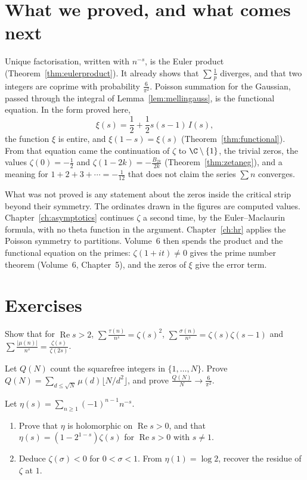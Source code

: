 \section{What we proved, and what comes next}

Unique factorisation, written with $n^{-s}$, is the Euler product (Theorem~\ref{thm:eulerproduct}). It already shows that $\sum\frac1p$ diverges, and that two integers are coprime with probability $\frac6{\pi^2}$. Poisson summation for the Gaussian, passed through the integral of Lemma~\ref{lem:mellingauss}, is the functional equation. In the form proved here,
\[
\xi(s)=\frac12+\frac12 s(s-1)\,I(s),
\]
the function $\xi$ is entire, and $\xi(1-s)=\xi(s)$ (Theorem~\ref{thm:functional}). From that equation came the continuation of $\zeta$ to $\C\setminus\{1\}$, the trivial zeros, the values $\zeta(0)=-\frac12$ and $\zeta(1-2k)=-\frac{B_{2k}}{2k}$ (Theorem~\ref{thm:zetaneg}), and a meaning for $1+2+3+\cdots=-\frac1{12}$ that does not claim the series $\sum n$ converges.

What was not proved is any statement about the zeros inside the critical strip beyond their symmetry. The ordinates drawn in the figures are computed values. Chapter~\ref{ch:asymptotics} continues $\zeta$ a second time, by the Euler--Maclaurin formula, with no theta function in the argument. Chapter~\ref{ch:hr} applies the Poisson symmetry to partitions. Volume~6 then spends the product and the functional equation on the primes: $\zeta(1+it)\ne0$ gives the prime number theorem (Volume~6, Chapter~5), and the zeros of $\xi$ give the error term.
\section{Exercises}

\begin{exercise}[$\star$]\label{ex:tau}
Show that for $\operatorname{Re}s>2$, $\sum\frac{\tau(n)}{n^s}=\zeta(s)^2$, $\sum\frac{\sigma(n)}{n^s}=\zeta(s)\zeta(s-1)$ and $\sum\frac{|\mu(n)|}{n^s}=\frac{\zeta(s)}{\zeta(2s)}$.
\end{exercise}

\begin{exercise}[$\star\star$]\label{ex:squarefree}
Let $Q(N)$ count the squarefree integers in $\{1,\dots,N\}$. Prove $Q(N)=\sum_{d\le\sqrt N}\mu(d)\lfloor N/d^2\rfloor$, and prove $\frac{Q(N)}N\to\frac6{\pi^2}$.
\end{exercise}

\begin{exercise}[$\star\star$]\label{ex:eta}
Let $\eta(s)=\sum_{n\ge1}(-1)^{n-1}n^{-s}$.
\begin{enumerate}[label=(\alph*)]
\item Prove that $\eta$ is holomorphic on $\operatorname{Re}s>0$, and that $\eta(s)=(1-2^{1-s})\zeta(s)$ for $\operatorname{Re}s>0$ with $s\ne1$.
\item Deduce $\zeta(\sigma)<0$ for $0<\sigma<1$. From $\eta(1)=\log2$, recover the residue of $\zeta$ at $1$.
\end{enumerate}
\end{exercise}

